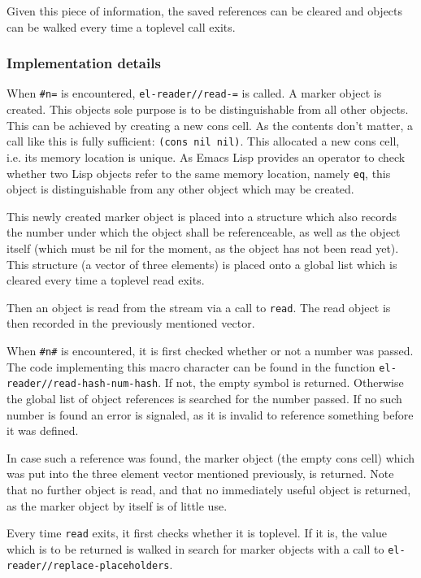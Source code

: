 \documentclass[a4paper,10pt,twoside]{report}
\newcommand{\el}{Emacs Lisp}
\newcommand{\fun}[1]{\texttt{#1}}
\newcommand{\Read}{\fun{read}}
\begin{document}
Given this piece of information, the saved references can be cleared and objects
can be walked every time a toplevel call exits.

\subsubsection{Implementation details}
\label{subsubsec:impl-details}

When \texttt{\#n=} is encountered, \fun{el-reader//read-=} is called.  A marker
object is created.  This objects sole purpose is to be distinguishable from all
other objects.  This can be achieved by creating a new cons cell.  As the
contents don’t matter, a call like this is fully sufficient: \texttt{(cons nil
  nil)}.  This allocated a new cons cell, i.e. its memory location is unique.
As \el{} provides an operator to check whether two Lisp objects refer to the
same memory location, namely \fun{eq}, this object is distinguishable from any
other object which may be created.

This newly created marker object is placed into a structure which also records
the number under which the object shall be referenceable, as well as the object
itself (which must be nil for the moment, as the object has not been read yet).
This structure (a vector of three elements) is placed onto a global list which
is cleared every time a toplevel read exits.

Then an object is read from the stream via a call to \Read{}.  The read object
is then recorded in the previously mentioned vector.

When \texttt{\#n\#} is encountered, it is first checked whether or not a number
was passed.  The code implementing this macro character can be found in the
function \fun{el-reader//read-hash-num-hash}.  If not, the empty symbol is
returned.  Otherwise the global list of object references is searched for the
number passed.  If no such number is found an error is signaled, as it is
invalid to reference something before it was defined.

In case such a reference was found, the marker object (the empty cons cell)
which was put into the three element vector mentioned previously, is returned.
Note that no further object is read, and that no immediately useful object is
returned, as the marker object by itself is of little use.

Every time \Read{} exits, it first checks whether it is toplevel.  If it is, the
value which is to be returned is walked in search for marker objects with a call
to \fun{el-reader//replace-placeholders}.
\end{document}
